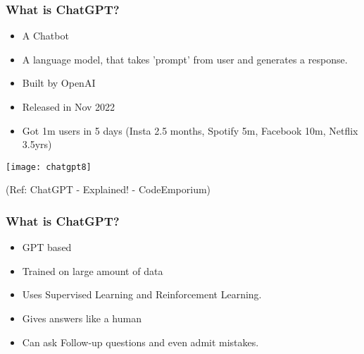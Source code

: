 \begin{frame}[fragile]\frametitle{What is ChatGPT?}


\begin{itemize}
\item A Chatbot
\item A language model, that takes 'prompt' from user and generates a response.
\item Built by OpenAI
\item Released in Nov 2022
\item Got 1m users in 5 days  (Insta 2.5 months, Spotify 5m, Facebook 10m, Netflix 3.5yrs)
\end{itemize}	 

\begin{center}
\texttt{[image: chatgpt8]}
\end{center}				
{\tiny (Ref: ChatGPT - Explained! - CodeEmporium)}
			
			
\end{frame}

\begin{frame}[fragile]\frametitle{What is ChatGPT?}


\begin{itemize}
\item GPT based
\item Trained on large amount of data
\item Uses Supervised Learning and Reinforcement Learning.
\item Gives answers like a human
\item Can ask Follow-up questions and even admit mistakes.
\end{itemize}	 

\end{frame}


